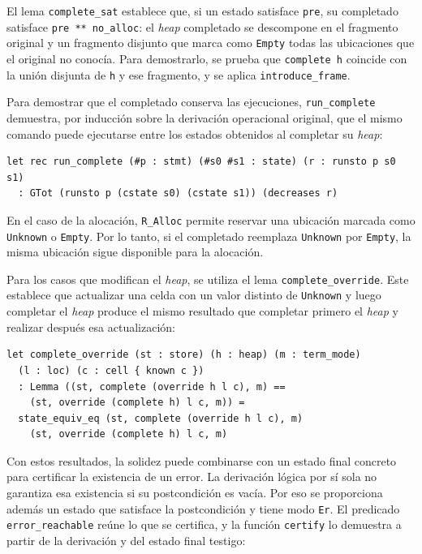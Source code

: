 \documentclass[a4paper,	11pt]{report}
\begin{document}
El lema \lstinline|complete_sat| establece que,
si un estado satisface \lstinline|pre|,
su completado satisface \lstinline|pre ** no_alloc|:
el \emph{heap} completado se descompone en el fragmento original y un fragmento disjunto
que marca como \lstinline|Empty| todas las ubicaciones que el original no conocía.
Para demostrarlo,
se prueba que \lstinline|complete h| coincide con la unión disjunta de \lstinline|h| y ese fragmento,
y se aplica \lstinline|introduce_frame|.

Para demostrar que el completado conserva las ejecuciones,
\lstinline|run_complete| demuestra,
por inducción sobre la derivación operacional original,
que el mismo comando puede ejecutarse entre los estados obtenidos al completar su \emph{heap}:

\begin{lstlisting}
let rec run_complete (#p : stmt) (#s0 #s1 : state) (r : runsto p s0 s1)
  : GTot (runsto p (cstate s0) (cstate s1)) (decreases r)
\end{lstlisting}

En el caso de la alocación,
\lstinline|R_Alloc| permite reservar una ubicación marcada como \lstinline|Unknown| o \lstinline|Empty|.
Por lo tanto,
si el completado reemplaza \lstinline|Unknown| por \lstinline|Empty|,
la misma ubicación sigue disponible para la alocación.

Para los casos que modifican el \emph{heap},
se utiliza el lema \lstinline|complete_override|.
Este establece que actualizar una celda con un valor distinto de \lstinline|Unknown|
y luego completar el \emph{heap} produce el mismo resultado que completar primero el \emph{heap} y realizar después esa actualización:

\begin{lstlisting}
let complete_override (st : store) (h : heap) (m : term_mode)
  (l : loc) (c : cell { known c })
  : Lemma ((st, complete (override h l c), m) == 
    (st, override (complete h) l c, m)) =
  state_equiv_eq (st, complete (override h l c), m)
    (st, override (complete h) l c, m)
\end{lstlisting}

Con estos resultados,
la solidez puede combinarse con un estado final concreto para certificar la existencia de un error.
La derivación lógica por sí sola no garantiza esa existencia si su postcondición es vacía.
Por eso se proporciona además un estado que satisface la postcondición y tiene modo \lstinline|Er|.
El predicado \lstinline|error_reachable| reúne lo que se certifica,
y la función \lstinline|certify| lo demuestra a partir de la derivación y del estado final testigo:
\end{document}
